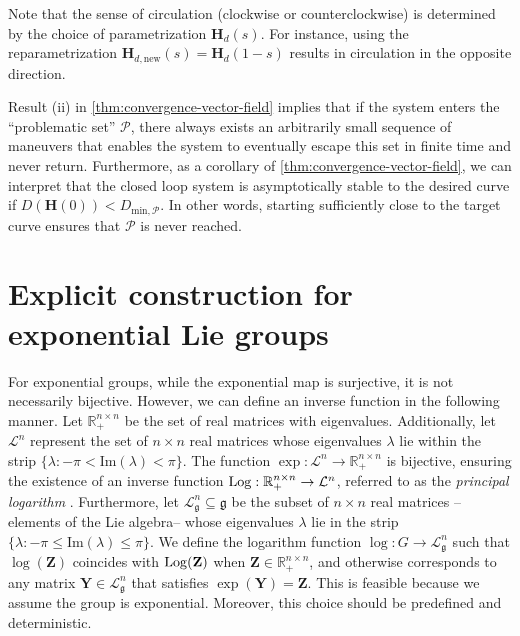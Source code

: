 Note that the sense of circulation (clockwise or counterclockwise) is determined by the choice of parametrization $\mathbf{H}_d(s)$. For instance, using the reparametrization $\mathbf{H}_{d,\text{new}}(s) = \mathbf{H}_d(1-s)$ results in circulation in the opposite direction.

Result (ii) in \cref{thm:convergence-vector-field} implies that if the system enters the ``problematic set'' $\mathcal{P}$, there always exists an arbitrarily small sequence of maneuvers that enables the system to eventually escape this set in finite time and never return. Furthermore, as a corollary of \cref{thm:convergence-vector-field}, we can interpret that the closed loop system is asymptotically stable to the desired curve if $D(\mathbf{H}(0)) < D_{\text{min}, \mathcal{P}}$. In other words, starting sufficiently close to the target curve ensures that $\mathcal{P}$ is never reached.
\section{Explicit construction for exponential Lie groups}\label{sec:kinematic-path-ee-dist-exp-group} %

For exponential  groups, while the exponential map is surjective, it is not necessarily bijective. However, we can define an inverse function in the following manner. Let $\mathbb{R}_+^{n\times n}$ be the set of real matrices with  eigenvalues. Additionally, let $\mathcal{L}^n$ represent the set of $n\times n$ real matrices whose eigenvalues $\lambda$ lie within the strip $\{\lambda : -\pi < \text{Im}(\lambda) < \pi\}$. The function $\exp:\mathcal{L}^n\to\mathbb{R}_+^{n\times n}$ is bijective, ensuring the existence of an inverse function $\operatorname{Log}: \mathbb{R}_+^{n\times n} \to \mathcal{L}^n$, referred to as the \emph{principal logarithm} \citep[p. 319]{Gallier2020}. Furthermore, let $\mathcal{L}_{\mathfrak{g}}^n\subseteq\mathfrak{g}$ be the subset of $n \times n$ real matrices -- elements of the Lie algebra-- whose eigenvalues $\lambda$ lie in the strip $\{\lambda : -\pi \le \text{Im}(\lambda) \le \pi\}$. We define the logarithm function $\log:G\to\mathcal{L}_{\mathfrak{g}}^n$ such that $\log(\mathbf{Z})$ coincides with $\operatorname{Log}(\mathbf{Z})$ when $\mathbf{Z}\in\mathbb{R}_+^{n\times n}$, and otherwise corresponds to any matrix $\mathbf{Y}\in\mathcal{L}_{\mathfrak{g}}^n$ that satisfies $\exp(\mathbf{Y}) = \mathbf{Z}$. This is feasible because we assume the group is exponential. Moreover, this choice should be predefined and deterministic.

